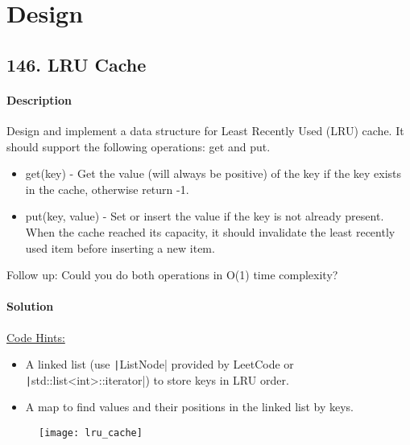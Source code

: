 \section{Design}

\subsection{146. LRU Cache}

\paragraph{\color{white} \colorbox{Mahogany}{Description}}
Design and implement a data structure for Least Recently Used (LRU) cache. It should support the following operations: get and put.
\begin{itemize}
    \item get(key) - Get the value (will always be positive) of the key if the key exists in the cache, otherwise return -1.
    \item put(key, value) - Set or insert the value if the key is not already present. When the cache reached its capacity, it should invalidate the least recently used item before inserting a new item.
\end{itemize}

Follow up:
Could you do both operations in O(1) time complexity?

\paragraph{\color{white} \colorbox{OliveGreen}{Solution}}
\underline{Code Hints:}
\begin{itemize}
    \item A linked list (use \texttt|ListNode| provided by LeetCode or \texttt|std::list<int>::iterator|) to store keys in LRU order.
    \item A map to find values and their positions in the linked list by keys.
\end{itemize}
\begin{figure}[ht]
    \centering
    \texttt{[image: lru\_cache]}
    \label{fig:lru_cache}
\end{figure}